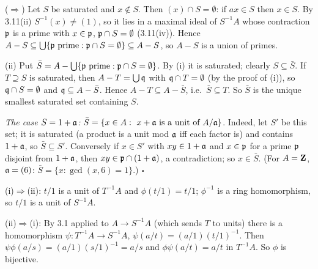 \documentclass[11pt]{article}
\begin{document}
($\Rightarrow$) Let $S$ be saturated and $x\notin S$. Then $(x)\cap S=\emptyset$: if $ax\in S$ then $x\in S$. By 3.11(ii) $S^{-1}(x)\ne(1)$, so it lies in a maximal ideal of $S^{-1}A$ whose contraction $\mathfrak p$ is a prime with $x\in\mathfrak p$, $\mathfrak p\cap S=\emptyset$ (3.11(iv)). Hence $A-S\subseteq\bigcup\{\mathfrak p\text{ prime}:\mathfrak p\cap S=\emptyset\}\subseteq A-S$, so $A-S$ is a union of primes.

(ii) Put $\bar S=A-\bigcup\{\mathfrak p\text{ prime}:\mathfrak p\cap S=\emptyset\}$. By (i) it is saturated; clearly $S\subseteq\bar S$. If $T\supseteq S$ is saturated, then $A-T=\bigcup\mathfrak q$ with $\mathfrak q\cap T=\emptyset$ (by the proof of (i)), so $\mathfrak q\cap S=\emptyset$ and $\mathfrak q\subseteq A-\bar S$. Hence $A-T\subseteq A-\bar S$, i.e.\ $\bar S\subseteq T$. So $\bar S$ is the unique smallest saturated set containing $S$.

\emph{The case $S=1+\mathfrak a$:} $\bar S=\{x\in A:\ x+\mathfrak a\text{ is a unit of }A/\mathfrak a\}$. Indeed, let $S'$ be this set; it is saturated (a product is a unit mod $\mathfrak a$ iff each factor is) and contains $1+\mathfrak a$, so $\bar S\subseteq S'$. Conversely if $x\in S'$ with $xy\in1+\mathfrak a$ and $x\in\mathfrak p$ for a prime $\mathfrak p$ disjoint from $1+\mathfrak a$, then $xy\in\mathfrak p\cap(1+\mathfrak a)$, a contradiction; so $x\in\bar S$. (For $A=\mathbf Z$, $\mathfrak a=(6)$: $\bar S=\{x:\gcd(x,6)=1\}$.) \hfill$\square$

\pf
(i)$\Rightarrow$(ii): $t/1$ is a unit of $T^{-1}A$ and $\phi(t/1)=t/1$; $\phi^{-1}$ is a ring homomorphism, so $t/1$ is a unit of $S^{-1}A$.

(ii)$\Rightarrow$(i): By 3.1 applied to $A\to S^{-1}A$ (which sends $T$ to units) there is a homomorphism $\psi:T^{-1}A\to S^{-1}A$, $\psi(a/t)=(a/1)(t/1)^{-1}$. Then $\psi\phi(a/s)=(a/1)(s/1)^{-1}=a/s$ and $\phi\psi(a/t)=a/t$ in $T^{-1}A$. So $\phi$ is bijective.
\end{document}

